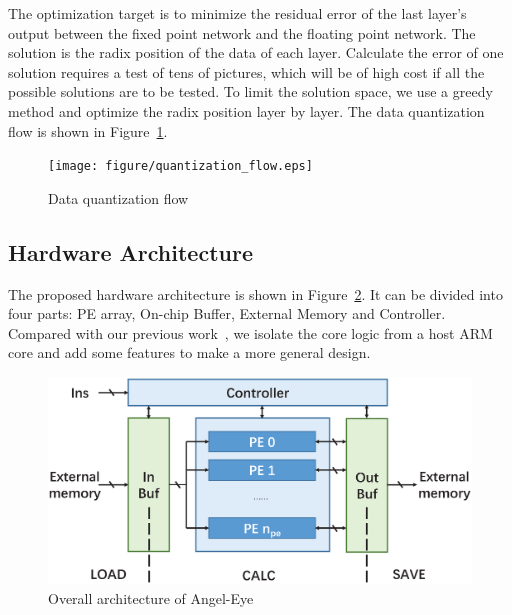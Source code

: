 \documentclass[10pt, conference, compsocconf]{IEEEtran}
\begin{document}
The optimization target is to minimize the residual error of the last layer's output between the fixed point network and the floating point network. The solution is the radix position of the data of each layer. Calculate the error of one solution requires a test of tens of pictures, which will be of high cost if all the possible solutions are to be tested. To limit the solution space, we use a greedy method and optimize the radix position layer by layer. The data quantization flow is shown in Figure~\ref{fig:quantization}.

\begin{figure}[t]
    \centering
    \texttt{[image: figure/quantization\_flow.eps]}
    \small
    \caption{Data quantization flow~\cite{qiu2016going}}
    \label{fig:quantization}
\end{figure}


\subsection{Hardware Architecture}
The proposed hardware architecture is shown in Figure~\ref{fig:arch}. It can be divided into four parts: PE array, On-chip Buffer, External Memory and Controller. Compared with our previous work~\cite{qiu2016going}, we isolate the core logic from a host ARM core and add some features to make a more general design.

\begin{figure}[t]
    \centering
    \includegraphics[width=1.0\columnwidth]{figure/hw_arch.eps}
    \small
    \caption{Overall architecture of Angel-Eye}
    \label{fig:arch}
\end{figure}
\end{document}

